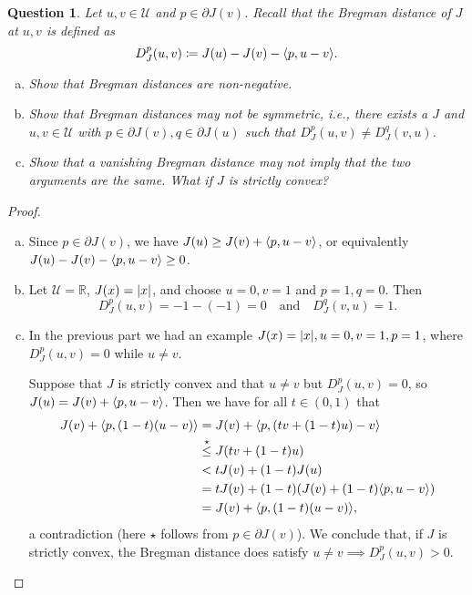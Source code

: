 \documentclass{article}
\theoremstyle{plain}
\newtheorem{question}{Question}
\theoremstyle{remark}
\newcommand{\Bb}{\mathbb}
\newcommand{\Cal}{\mathcal}
\newcommand{\RR}{\Bb R}
\newcommand\UU{\Cal U}
\DeclarePairedDelimiter{\ang}{\langle}{\rangle}
\newcommand\ceq\coloneqq %
\newcommand\pt\partial
\begin{document}
\begin{question}
	Let $u, v \in \UU$ and $p \in \pt J(v)$. Recall that the Bregman distance of $J$ at $u, v$ is defined as
	\[
	D_J^p(u, v) \ceq J(u) - J(v) - \ang{p, u - v}.
	\]
	\begin{enumerate}[(a)]
		\item Show that Bregman distances are non-negative. 
		\item Show that Bregman distances may not be symmetric, i.e., there exists a $J$ and $u, v \in \UU$ with $p \in \pt J(v), q \in \pt J(u)$ such that $D_J^p(u, v) \neq D_J^q(v, u)$.
		\item Show that a vanishing Bregman distance may not imply that the two arguments are the same. What if $J$ is strictly convex?
	\end{enumerate}

\end{question}

\begin{proof}
	\begin{enumerate}[(a)]
		\item Since $p \in \pt J(v)$, we have $J(u) \geq J(v) + \ang{p, u - v}$, or equivalently $J(u) - J(v) - \ang{p, u- v} \geq 0$. 
		
		\item Let $\UU = \RR$, $J(x) = \abs{x}$, and choose $u = 0, v = 1$ and $p = 1, q = 0$. Then 
		\[
		D^p_J(u, v) = -1 - (-1) =  0 \quad\text{and}\quad D^q_J(v, u) = 1. 
		\]
		
		\item In the previous part we had an example $J(x)= \abs{x}, u = 0, v = 1, p = 1$, where $D_J^p(u, v) = 0$ while $u \neq v$. 
		
		Suppose that $J$ is strictly convex and that $u \neq v$ but $D_J^p(u, v) = 0$, so $J(u) = J(v) + \ang{p, u-v}$. Then we have for all $t \in (0, 1)$ that 
		\begin{align*}
			J(v) + \ang{p, (1-t)(u-v)} &= J(v) + \ang{p,  \qty(tv + (1-t)u) -v} \\
			&\overset\star\leq J(tv + (1-t) u) \\
			&< t J(v) + (1-t) J(u) \\
			&= t J(v) + (1-t) \qty(J(v) + (1-t)\ang{p, u-v}) \\
			&= J(v) + \ang{p, (1-t)(u-v)}, 
		\end{align*}
	a contradiction (here $\star$ follows from $p \in \pt J(v)$). We conclude that, if $J$ is strictly convex, the Bregman distance does satisfy $u \neq v \implies D_J^p(u, v) > 0$. 
		
	\end{enumerate}
\end{proof}
\end{document}
